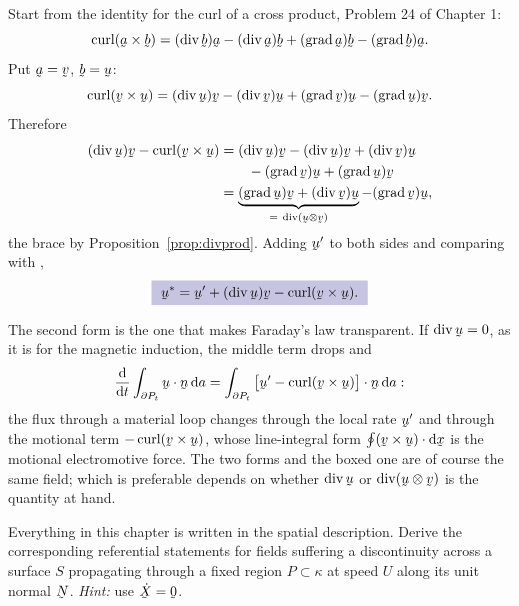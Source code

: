 \begin{solution}
Start from the identity for the curl of a cross product, Problem 24 of
Chapter 1:
\[
   \crl(\ba\times\bb)=(\dvg\bb)\ba-(\dvg\ba)\bb
   +(\grad\ba)\bb-(\grad\bb)\ba .
\]
Put $\ba=\bv$, $\bb=\bu$:
\[
   \crl(\bv\times\bu)=(\dvg\bu)\bv-(\dvg\bv)\bu
   +(\grad\bv)\bu-(\grad\bu)\bv .
\]
Therefore
\[
\begin{aligned}
   (\dvg\bu)\bv-\crl(\bv\times\bu)
   &=(\dvg\bu)\bv-(\dvg\bu)\bv+(\dvg\bv)\bu\\
   &\qquad-(\grad\bv)\bu+(\grad\bu)\bv\\
   &=\underbrace{(\grad\bu)\bv+(\dvg\bv)\bu}
     _{=\ \dvg(\bu\otimes\bv)}-(\grad\bv)\bu ,
\end{aligned}
\]
the brace by Proposition~\ref{prop:divprod}. Adding $\bu'$ to both sides
and comparing with ,
\[
   \boxed{\ \bu^{*}=\bu'+(\dvg\bu)\bv-\crl(\bv\times\bu).\ }
\]

The second form is the one that makes Faraday's law transparent. If
$\dvg\bu=0$, as it is for the magnetic induction, the middle term drops
and
\[
   \frac{\dl}{\dl t}\int_{\partial P_{t}}\ip\bu\bn\,\dl a
   =\int_{\partial P_{t}}\ip{\big[\bu'-\crl(\bv\times\bu)\big]}\bn\,\dl a :
\]
the flux through a material loop changes through the local rate $\bu'$
and through the motional term $-\crl(\bv\times\bu)$, whose line-integral
form $\oint\ip{(\bv\times\bu)}{\dl\bx}$ is the motional electromotive
force. The two forms  and the boxed one are of course the same
field; which is preferable depends on whether $\dvg\bu$ or
$\dvg(\bu\otimes\bv)$ is the quantity at hand.
\end{solution}

\begin{problem}
Everything in this chapter is written in the spatial description. Derive
the corresponding referential statements for fields suffering a
discontinuity across a surface $S$ propagating through a fixed region
$P\subset\kappa$ at speed $U$ along its unit normal $\bN$. \emph{Hint:}
use $\dot\bX=\bze$.
\end{problem}

